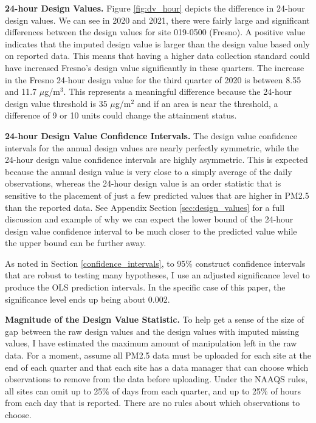 \documentclass[12pt]{article}
\begin{document}
\noindent\textbf{24-hour Design Values.} Figure \ref{fig:dv_hour} depicts the difference in 24-hour design values. We can see in 2020 and 2021, there were fairly large and significant differences between the design values for site 019-0500 (Fresno). A positive value indicates that the imputed design value is larger than the design value based only on reported data. This means that having a higher data collection standard could have increased Fresno's design value significantly in these quarters. The increase in the Fresno 24-hour design value for the third quarter of 2020 is between 8.55 and 11.7 $\mu$g/m$^3$. This represents a meaningful difference because the 24-hour design value threshold is 35 $\mu$g/m$^2$ and if an area is near the threshold, a difference of 9 or 10 units could change the attainment status.


\noindent\textbf{24-hour Design Value Confidence Intervals.}
The design value confidence intervals for the annual design values are nearly perfectly symmetric, while the 24-hour design value confidence intervals are highly asymmetric. This is expected because the annual design value is very close to a simply average of the daily observations, whereas the 24-hour design value is an order statistic that is sensitive to the placement of just a few predicted values that are higher in PM2.5 than the reported data. See Appendix Section \ref{sec:design_values} for a full discussion and example of why we can expect the lower bound of the 24-hour design value confidence interval to be much closer to the predicted value while the upper bound can be further away.

As noted in Section \ref{confidence_intervals}, to 95\% construct confidence intervals that are robust to testing many hypotheses, I use an adjusted significance level to produce the OLS prediction intervals. In the specific case of this paper, the significance level ends up being about 0.002.

\textbf{Magnitude of the Design Value Statistic.} To help get a sense of the size of gap between the raw design values and the design values with imputed missing values, I have estimated the maximum amount of manipulation left in the raw data. For a moment, assume all PM2.5 data must be uploaded for each site at the end of each quarter and that each site has a data manager that can choose which observations to remove from the data before uploading. Under the NAAQS rules, all sites can omit up to 25\% of days from each quarter, and up to 25\% of hours from each day that is reported. There are no rules about which observations to choose.
\end{document}
